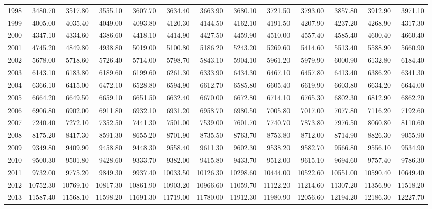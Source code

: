\begin{longtable}{rrrrrrrrrrrrr}
  1998 & 3480.70 & 3517.80 & 3555.10 & 3607.70 & 3634.40 & 3663.90 & 3680.10 & 3721.50 & 3793.00 & 3857.80 & 3912.90 & 3971.10 \\ 
  1999 & 4005.00 & 4035.40 & 4049.00 & 4093.80 & 4120.30 & 4144.50 & 4162.10 & 4191.50 & 4207.90 & 4237.20 & 4268.90 & 4317.30 \\ 
  2000 & 4347.10 & 4334.60 & 4386.60 & 4418.10 & 4414.90 & 4427.50 & 4459.90 & 4510.00 & 4557.40 & 4585.40 & 4600.40 & 4660.40 \\ 
  2001 & 4745.20 & 4849.80 & 4938.80 & 5019.00 & 5100.80 & 5186.20 & 5243.20 & 5269.60 & 5414.60 & 5513.40 & 5588.90 & 5660.90 \\ 
  2002 & 5678.00 & 5718.60 & 5726.40 & 5714.00 & 5798.70 & 5843.10 & 5904.10 & 5961.20 & 5979.90 & 6000.90 & 6132.80 & 6184.40 \\ 
  2003 & 6143.10 & 6183.80 & 6189.60 & 6199.60 & 6261.30 & 6333.90 & 6434.30 & 6467.10 & 6457.80 & 6413.40 & 6386.20 & 6341.30 \\ 
  2004 & 6366.10 & 6415.00 & 6472.10 & 6528.80 & 6594.90 & 6612.70 & 6585.80 & 6605.40 & 6619.90 & 6603.80 & 6634.20 & 6644.00 \\ 
  2005 & 6664.20 & 6649.50 & 6659.10 & 6651.50 & 6632.40 & 6670.00 & 6672.80 & 6714.10 & 6765.30 & 6802.30 & 6812.90 & 6862.20 \\ 
  2006 & 6906.80 & 6902.00 & 6911.80 & 6932.10 & 6931.20 & 6958.70 & 6980.50 & 7005.80 & 7017.00 & 7077.80 & 7116.20 & 7192.60 \\ 
  2007 & 7240.40 & 7272.10 & 7352.50 & 7441.30 & 7501.00 & 7539.00 & 7601.70 & 7740.70 & 7873.80 & 7976.50 & 8060.80 & 8110.60 \\ 
  2008 & 8175.20 & 8417.30 & 8591.30 & 8655.20 & 8701.90 & 8735.50 & 8763.70 & 8753.80 & 8712.00 & 8714.90 & 8826.30 & 9055.90 \\ 
  2009 & 9349.80 & 9409.90 & 9458.80 & 9448.30 & 9558.40 & 9611.30 & 9602.30 & 9538.20 & 9582.70 & 9566.80 & 9556.10 & 9534.90 \\ 
  2010 & 9500.30 & 9501.80 & 9428.60 & 9333.70 & 9382.00 & 9415.80 & 9433.70 & 9512.00 & 9615.10 & 9694.60 & 9757.40 & 9786.30 \\ 
  2011 & 9732.00 & 9775.20 & 9849.30 & 9937.40 & 10033.50 & 10126.30 & 10298.60 & 10444.00 & 10522.60 & 10551.00 & 10590.40 & 10649.40 \\ 
  2012 & 10752.30 & 10769.10 & 10817.30 & 10861.90 & 10903.20 & 10966.60 & 11059.70 & 11122.20 & 11214.60 & 11307.20 & 11356.90 & 11518.20 \\ 
  2013 & 11587.40 & 11568.10 & 11598.20 & 11691.30 & 11719.00 & 11780.00 & 11912.30 & 11980.90 & 12056.60 & 12194.20 & 12186.30 & 12227.70 \\ 

\end{longtable}
